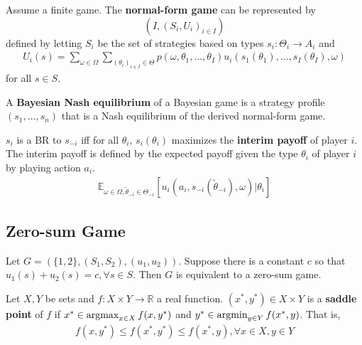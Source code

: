 \documentclass[11pt]{elegantbook}
\newcommand{\argmax}{\operatornamewithlimits{argmax}}
\newcommand{\argmin}{\operatornamewithlimits{argmin}}
\begin{document}
\begin{definition}
    \normalfont
    Assume a finite game. The \textbf{normal-form game} can be represented by $$\left(I,(S_i,U_i)_{i\in I}\right)$$ defined by letting $S_i$ be the set of strategies based on types $s_i:\Theta_i \rightarrow A_i$ and
    \begin{equation}
        \begin{aligned}
            U_i(s)=\sum_{\omega\in\Omega}\sum_{(\theta_i)_{i\in I}\in \Theta}p(\omega,\theta_1,...,\theta_I)u_i(s_1(\theta_1),..., s_I(\theta_I),\omega)
        \end{aligned}
        \nonumber
    \end{equation}
    for all $s\in S$.

    A \textbf{Bayesian Nash equilibrium} of a Bayesian game is a strategy profile $(s_1,...,s_n)$ that is a Nash equilibrium of the derived normal-form game.
\end{definition}

\begin{definition}
    \normalfont
    $s_i$ is a BR to $s_{-i}$ iff for all $\theta_i$, $s_i(\theta_i)$ maximizes the \textbf{interim payoff} of player $i$. The interim payoff is defined by the expected payoff given the type $\theta_i$ of player $i$ by playing action $a_i$.
    \begin{equation}
        \begin{aligned}
            \mathbb{E}_{\omega\in\Omega,\tilde{\theta}_{-i}\in\Theta_{-i}}[u_i(a_i,s_{-i}(\tilde{\theta}_{-i}),\omega)|\theta_i]
        \end{aligned}
        \nonumber
    \end{equation}
\end{definition}

\subsection{Zero-sum Game}
Let $G=(\{1,2\},(S_1,S_2),(u_1,u_2))$. Suppose there is a constant $c$ so that $u_1(s)+u_2(s)=c, \forall s\in S$. Then $G$ is equivalent to a zero-sum game.

\begin{definition}
    \normalfont
    Let $X,Y$ be sets and $f:X\times Y \rightarrow \mathbb{R}$ a real function. $(x^*,y^*)\in X\times Y$ is a \textbf{saddle point} of $f$ if $x^*\in\argmax_{x\in X}f(x,y^*)$ and $y^*\in\argmin_{y\in Y}f(x^*,y)$. That is,
    \begin{equation}
        \begin{aligned}
            f(x,y^*)\leq f(x^*,y^*)\leq f(x^*,y),\forall x\in X,y\in Y
        \end{aligned}
        \nonumber
    \end{equation}
\end{definition}
\end{document}
